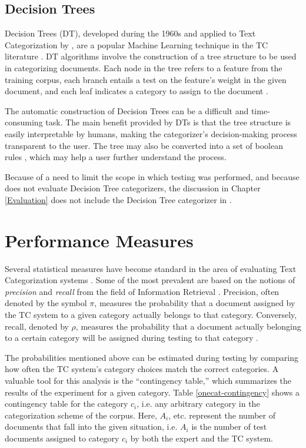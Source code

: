 \subsection{Decision Trees}

Decision Trees (DT), developed during the 1960s and applied to Text
Categorization by \cite{quinlan:89}, are a popular Machine Learning
technique in the TC literature \cite[ch. 3]{mitchell:97}
\cite[p. 22]{sebastiani:02} \cite[sec. 16.1]{manning:99}.  DT
algorithms involve the construction of a tree structure to be used in
categorizing documents.  Each node in the tree refers to a feature
from the training corpus, each branch entails a test on the feature's
weight in the given document, and each leaf indicates a category to
assign to the document \cite[p. 22]{sebastiani:02}.

The automatic construction of Decision Trees can be a difficult and
time-consuming task.  The main benefit provided by DTs is that the
tree structure is easily interpretable by humans, making the
categorizer's decision-making process transparent to the user.  The
tree may also be converted into a set of boolean rules
\cite[sec. 3.7.1.2]{mitchell:97}, which may help a user further
understand the process.

Because of a need to limit the scope in which
testing was performed, and because \cite{yang:99} does not
evaluate Decision Tree categorizers, the discussion in Chapter
\ref{Evaluation} does not include the Decision Tree categorizer in
\aicat.


\section{Performance Measures}
\label{measures}

Several statistical measures have become standard in the area of
evaluating Text Categorization systems \cite[p. 33]{sebastiani:02}.
Some of the most prevalent are based on the notions of
\emph{precision} and \emph{recall} from the field of Information
Retrieval \cite{rijsbergen:79}. Precision, often denoted by the symbol
$\pi$, measures the probability that a document assigned by the TC
system to a given category actually belongs to that category.
Conversely, recall, denoted by $\rho$, measures the probability that a
document actually belonging to a certain category will be assigned
during testing to that category \cite[p. 33]{sebastiani:02}.

The probabilities mentioned above can be estimated during testing by
comparing how often the TC system's category choices match the correct
categories.  A valuable tool for this analysis is the ``contingency
table,'' which summarizes the results of the experiment for a given
category.  Table \ref{onecat-contingency} shows a contingency table
for the category $c_i$, i.e. any arbitrary category in the
categorization scheme of the corpus.  Here, $A_i$, etc. represent the
number of documents that fall into the given situation, i.e. $A_i$ is
the number of test documents assigned to category $c_i$ by both the
expert and the TC system.

